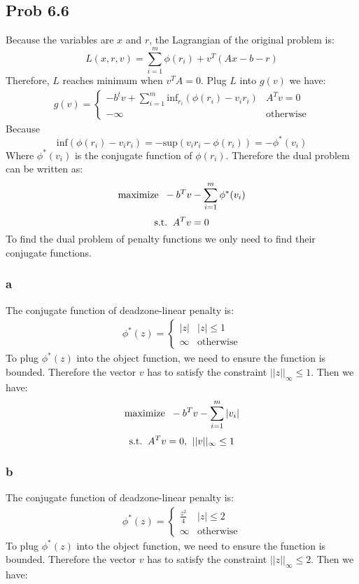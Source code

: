 \message{ !name(ass4_ChangLi.tex)}\documentclass[10pt,a4paper]{article}
\begin{document}
\subsection{Prob 6.6}
Because the variables are $x$ and $r$, the Lagrangian of the
original problem is:
$$
L(x,r,v) = \sum_{i=1}^{m}\phi(r_i)+v^T(Ax-b-r)
$$
Therefore, $L$ reaches minimum when $v^TA=0$. Plug $L$ into
$g(v)$ we have: 
\begin{align*}
  g(v)=
  \begin{cases}
    -b^tv+\sum_{i=1}^{m}\text{inf}_{r_i}(\phi(r_i)-v_ir_i) & A^Tv=0 \\
    -\infty & \text{otherwise}
  \end{cases}
\end{align*}
Because 
$$\text{inf}(\phi(r_i) - v_ir_i) = - \text{sup}(v_ir_i - \phi(r_i)) = -\phi^*(v_i)$$
Where $\phi^*(v_i)$ is the conjugate function of
$\phi(r_i)$. Therefore the dual problem can be written as:
$$\text{maximize\;\;} -b^Tv-\sum_{i=1}^{m}\phi^*(v_i)$$
$$\text{s.t.\;\;} A^Tv=0$$
To find the dual problem of penalty functions we only need
to find their conjugate functions.

\subsubsection{a}
The conjugate function of deadzone-linear penalty is:
\begin{align*}
  \phi^*(z) = 
  \begin{cases}
    |z| & |z|\leq 1\\
    \infty & \text{otherwise}
  \end{cases}
\end{align*}
To plug $\phi^*(z)$ into the object function, we need to
ensure the function is bounded. Therefore the vector $v$
has to satisfy the constraint $||z||_{\infty}\leq 1$. Then
we have:
$$\text{maximize\;\;} -b^Tv-\sum_{i=1}^{m}|v_i|$$
$$\text{s.t.\;\;} A^Tv=0\text{,\;\;} ||v||_{\infty}\leq 1$$
\subsubsection{b}
The conjugate function of deadzone-linear penalty is:
\begin{align*}
  \phi^*(z) = 
  \begin{cases}
    \frac{z^2}{4} & |z|\leq 2\\
    \infty & \text{otherwise}
  \end{cases}
\end{align*}
To plug $\phi^*(z)$ into the object function, we need to
ensure the function is bounded. Therefore the vector $v$
has to satisfy the constraint $||z||_{\infty}\leq 2$. Then
we have:
\end{document}
